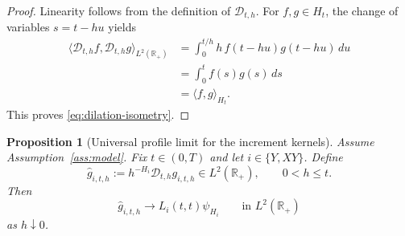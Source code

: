 \documentclass[11pt,a4paper]{amsart}
\theoremstyle{plain}
\newtheorem{proposition}[theorem]{Proposition}
\theoremstyle{definition}
\theoremstyle{remark}
\newcommand{\R}{\mathbb{R}}
\begin{document}
\begin{proof}
Linearity follows from the definition of \(\mathcal D_{t,h}\).  For \(f,g\in H_t\), the change of
variables \(s=t-hu\) yields
\begin{align*}
\langle \mathcal D_{t,h}f,\mathcal D_{t,h}g\rangle_{L^2(\R_+)}
&=
\int_0^{t/h} h\,f(t-hu)g(t-hu)\,du \\
&=
\int_0^t f(s)g(s)\,ds \\
&=
\langle f,g\rangle_{H_t}.
\end{align*}
This proves \eqref{eq:dilation-isometry}.
\end{proof}

\begin{proposition}[Universal profile limit for the increment kernels]
\label{prop:profile}
Assume Assumption~\ref{ass:model}. Fix $t\in(0,T)$ and let $i\in\{Y,XY\}$. Define
\begin{equation}\label{eq:profile-gh}
\widehat g_{i,t,h}
:=
h^{-H_i}\mathcal D_{t,h}g_{i,t,h}
\in L^2(\R_+),
\qquad 0<h\le t.
\end{equation}
Then
\begin{equation}\label{eq:profile-limit}
\widehat g_{i,t,h}\longrightarrow L_i(t,t)\psi_{H_i}
\qquad\text{in }L^2(\R_+)
\end{equation}
as $h\downarrow0$.
\end{proposition}
\end{document}
